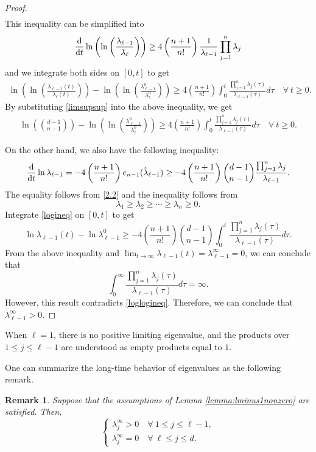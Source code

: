 \documentclass[11pt,reqno]{amsart}
\numberwithin{figure}{section}
\def\d {{\partial}}
\def\d{\mathrm{d}}
\newcommand{\dm}{d}
\renewcommand{\d}{  {\textup{d}} }
\newtheorem{remark}{Remark}[section]
\begin{document}
\begin{proof}
\begin{align*}
\end{align*}
This inequality can be simplified into
\[
	\frac{\d}{\d t}\ln\left(\ln\left(\frac{\lambda_{\ell-1}}{\lambda_{\ell}}\right)\right)\geq4\left(\frac{n+1}{n!}\right)\frac{1}{\lambda_{\ell-1}}\prod_{j=1}^{n}\lambda_j
\]
and we integrate both sides on $[0, t]$ to get
\begin{align*}
\ln\left(\ln\left(\frac{\lambda_{\ell-1}(t)}{\lambda_{\ell}(t)}\right)\right)-\ln\left(\ln\left(\frac{\lambda_{\ell-1}^0}{\lambda_{\ell}^0}\right)\right)\geq 4\left(\frac{n+1}{n!}\right)\int_{0}^t \frac{\prod_{j=1}^{n}\lambda_j(\tau)}{\lambda_{\ell-1}(\tau)}d\tau\quad\forall~t\geq0.
\end{align*}
By substituting \eqref{limsupsup} into the above inequality, we get
\begin{align}\label{loglogineq}
\ln\left({d-1\choose n-1}\right)-\ln\left(\ln\left(\frac{\lambda_{\ell-1}^0}{\lambda_{\ell}^0}\right)\right)\geq 4\left(\frac{n+1}{n!}\right)\int_{0}^t \frac{\prod_{j=1}^{n}\lambda_j(\tau)}{\lambda_{\ell-1}(\tau)}d\tau\quad\forall~t\geq0.
\end{align}



On the other hand, we also have the following inequality:
\begin{align}\label{logineq}
\frac{\d}{\d t}\ln\lambda_{\ell-1}=-4\left(\frac{n+1}{n!}\right)e_{n-1}(\hat{\lambda}_{\ell-1})\geq -4\left(\frac{n+1}{n!}\right){d-1\choose n-1}\frac{\prod_{j=1}^{n}\lambda_j}{\lambda_{\ell-1}}.
\end{align}
The equality follows from \eqref{2.2} and the inequality follows from
\[
\lambda_1\geq \lambda_{2}\geq\cdots\geq \lambda_n\geq0.
\]
Integrate \eqref{logineq} on $[0,t]$ to get
\[
\ln\lambda_{\ell-1}(t)-\ln\lambda_{\ell-1}^0\geq  -4\left(\frac{n+1}{n!}\right){d-1\choose n-1}\int_0^t\frac{\prod_{j=1}^{n}\lambda_j(\tau)}{\lambda_{\ell-1}(\tau)}d\tau.
\]
From the above inequality and $\lim_{t\to\infty}\lambda_{\ell-1}(t)=\lambda_{\ell-1}^\infty=0$, we can conclude that
\[
\int_{0}^\infty \frac{\prod_{j=1}^{n}\lambda_j(\tau)}{\lambda_{\ell-1}(\tau)}d\tau=\infty.
\]
However, this result contradicts   \eqref{loglogineq}. Therefore, we can conclude that $\lambda_{\ell-1}^\infty>0$.
\end{proof}

When \(\ell=1\), there is no positive limiting eigenvalue, and the products over
\(1\le j\le \ell-1\)  are understood as empty products equal to \(1\).

One can summarize the long-time behavior of eigenvalues as the following remark.
\begin{remark}
Suppose that the assumptions of Lemma \ref{lemma:lminus1nonzero} are satisfied. Then,
\[
\begin{cases}
\lambda_j^\infty>0\quad\forall~1\leq j\leq \ell-1,\\
\lambda_j^\infty=0\quad\forall~\ell\leq j\leq \dm.
\end{cases}
\]
\end{remark}
\end{document}

